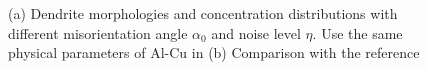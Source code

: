 \documentclass[a4paper,12pt]{article}
\begin{document}
 \begin{figure}[!ht]
 \centering
     \hfill
     
     \caption{(a) Dendrite morphologies and concentration distributions with different misorientation angle $\alpha_0$ and noise level $\eta$. Use the same physical parameters of Al-Cu in \cite{Takaki2014}(b) Comparison with the reference \cite{Takaki2014}}
     \label{fig:Ech}
   \end{figure}
   



   




\end{document}
